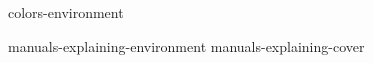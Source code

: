 
\startenvironment colors-environment

    \environment manuals-explaining-environment
    \environment manuals-explaining-cover

\stopenvironment

